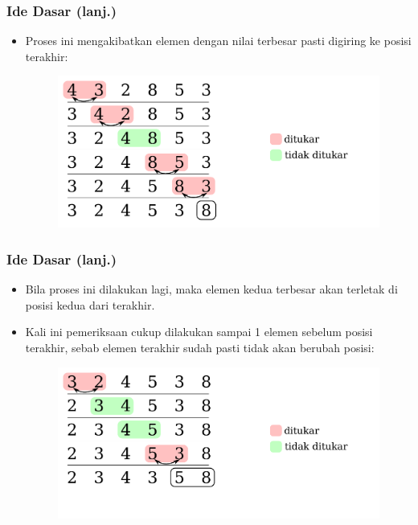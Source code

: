 \begin{frame}
\frametitle{Ide Dasar (lanj.)}
  \begin{itemize}
    \item Proses ini mengakibatkan elemen dengan nilai terbesar pasti
    digiring ke posisi terakhir:
    
    \begin{figure}
      \includegraphics[width=11cm]{asset/bubble-sort-1.pdf}
    \end{figure}
  \end{itemize}
\end{frame}

\begin{frame}
\frametitle{Ide Dasar (lanj.)}
  \begin{itemize}
    \item Bila proses ini dilakukan lagi, maka elemen kedua terbesar
    akan terletak di posisi kedua dari terakhir.
    \item Kali ini pemeriksaan cukup dilakukan sampai 1 elemen
    sebelum posisi terakhir, sebab elemen terakhir sudah pasti
    tidak akan berubah posisi:
    
    \begin{figure}
      \includegraphics[width=11cm]{asset/bubble-sort-2.pdf}
    \end{figure}
  \end{itemize}
  
\end{frame}

